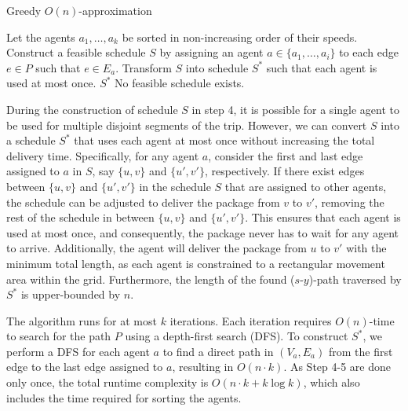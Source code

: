 \begin{algorithm}[H]
\caption{Greedy $O(n)$-approximation}
\label{alg:greedy}
\begin{algorithmic}[1]
\STATE Let the agents $a_1, \dots, a_k$ be sorted in non-increasing order of their speeds. 
        \STATE Construct a feasible schedule \( S \) by assigning an agent \( a \in \{a_1, \dots, a_i\} \) to each edge \( e \in P \) such that \( e \in E_a \).
        \STATE Transform \( S \) into schedule \( S^* \) such that each agent is used at most once.   %
        \RETURN \( S^* \)
    \ENDIF
\ENDFOR
\RETURN No feasible schedule exists.
\end{algorithmic}
\end{algorithm}
\noindent

During the construction of schedule $S$ in step 4, it is possible for a single agent to be used for multiple disjoint segments of the trip. However, we can convert $S$ into a schedule $S^*$ that uses each agent at most once  without increasing the total delivery time. 
Specifically, for any agent $a$, consider the first and last edge assigned to $a$ in $S$, say $\{u, v\}$ and $\{u', v'\}$, respectively. If there exist edges between $\{u, v\}$ and $\{u', v'\}$ in the schedule $S$ that are assigned to other agents, the schedule can be adjusted to deliver the package from $v$ to $v'$, removing the rest of the schedule in between $\{u, v\}$ and $\{u', v'\}$.  This ensures that each agent is used at most once, and consequently, the package never has to wait for any agent to arrive. Additionally, the agent will deliver the package from $u$ to $v'$ with the minimum total length, as each agent is constrained to a rectangular movement area within the grid. Furthermore, the length of the found ($s$-$y$)-path traversed by $S^*$ is upper-bounded by $n$.

The algorithm runs for at most \( k \) iterations. Each iteration requires \( O(n) \)-time to search for the path $P$ using a depth-first search (DFS). To construct $S^*$, we perform a DFS for each agent $a$ to find a direct path in $(V_a,E_a)$ from the first edge to the last edge assigned to $a$, resulting in $O(n\cdot k)$.   As Step 4-5 are done only once, the total runtime complexity is $O(n \cdot k + k \log k)$, which also includes the time required for sorting the agents.

